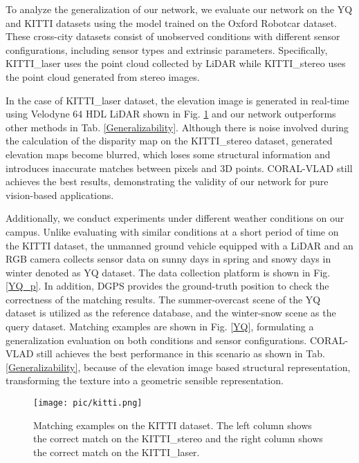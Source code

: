 \documentclass[letterpaper, 10 pt, conference]{ieeeconf}  \usepackage{tabularx}
\begin{document}
To analyze the generalization of our network, we evaluate our network on the YQ and KITTI datasets using the model trained on the Oxford Robotcar dataset. These cross-city datasets consist of unobserved conditions with different sensor configurations, including sensor types and extrinsic parameters. Specifically, KITTI\_laser uses the point cloud collected by LiDAR while KITTI\_stereo uses the point cloud generated from stereo images.  

In the case of KITTI\_laser dataset, the elevation image is generated in real-time using Velodyne 64 HDL LiDAR shown in Fig. \ref{Kitti} and our network outperforms other methods in Tab. \ref{Generalizability}. Although there is noise involved during the calculation of the disparity map on the KITTI\_stereo dataset, generated elevation maps become blurred, which loses some structural information and introduces inaccurate matches between pixels and 3D points. CORAL-VLAD still achieves the best results, demonstrating the validity of our network for pure vision-based applications. 

Additionally, we conduct experiments under different weather conditions on our campus. Unlike evaluating with similar conditions at a short period of time on the KITTI dataset, the unmanned ground vehicle equipped with a LiDAR and an RGB camera collects sensor data on sunny days in spring and snowy days in winter denoted as YQ dataset. The data collection platform is shown in Fig. \ref{YQ_p}. In addition, DGPS provides the ground-truth position to check the correctness of the matching results. The summer-overcast scene of the YQ dataset is utilized as the reference database, and the winter-snow scene as the query dataset. Matching examples are shown in Fig. \ref{YQ}, formulating a generalization evaluation on both conditions and sensor configurations. CORAL-VLAD still achieves the best performance in this scenario as shown in Tab. \ref{Generalizability}, because of the elevation image based structural representation, transforming the texture into a geometric sensible representation.

\begin{figure}[tp]
	\vspace{2.6mm}
	\centering
	\texttt{[image: pic/kitti.png]}
	
	\caption{Matching examples on the KITTI dataset. The left column shows the correct match on the KITTI\_stereo and the right column shows the correct match on the KITTI\_laser.}
	\label{Kitti}
	\vspace{-3pt}
	
\end{figure}
\end{document}
